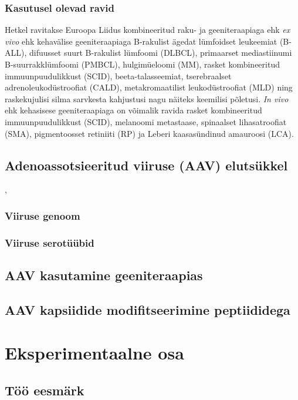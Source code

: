 \documentclass{trkut}%
\begin{document}
\subsection{Kasutusel olevad ravid}

Hetkel ravitakse Euroopa Liidus kombineeritud raku- ja geeniteraapiaga ehk  \textit{ex vivo} ehk kehavälise geeniteraapiaga B-rakulist ägedat lümfoidset leukeemiat (B-ALL), difuusset suurt B-rakulist lümfoomi (DLBCL), primaarset mediastiinumi B-suurrakklümfoomi (PMBCL), hulgimüeloomi (MM), rasket kombineeritud immuunpuudulikkust (SCID), beeta-talasseemiat, tserebraalset adrenoleukodüstroofiat (CALD), metakromaatilist leukodüstroofiat (MLD) ning raskekujulisi silma sarvkesta kahjustusi nagu näiteks keemilisi põletusi. \textit{In vivo} ehk kehasisese geeniteraapiaga on võimalik ravida rasket kombineeritud immuunpuudulikkust (SCID), melanoomi metastaase, spinaalset lihasatroofiat (SMA), pigmentoosset retiniiti (RP) ja Leberi kaasasündinud amauroosi (LCA). \parencite{genpraegu}


\section{Adenoassotsieeritud viiruse (AAV) elutsükkel}

\parencite{g}, \parencite{r}

\subsection{Viiruse genoom}

\subsection{Viiruse serotüübid}

\section{AAV kasutamine geeniteraapias}

\section{AAV kapsiidide modifitseerimine peptiididega}

\chapter{Eksperimentaalne osa}

\section{Töö eesmärk}
\end{document}
